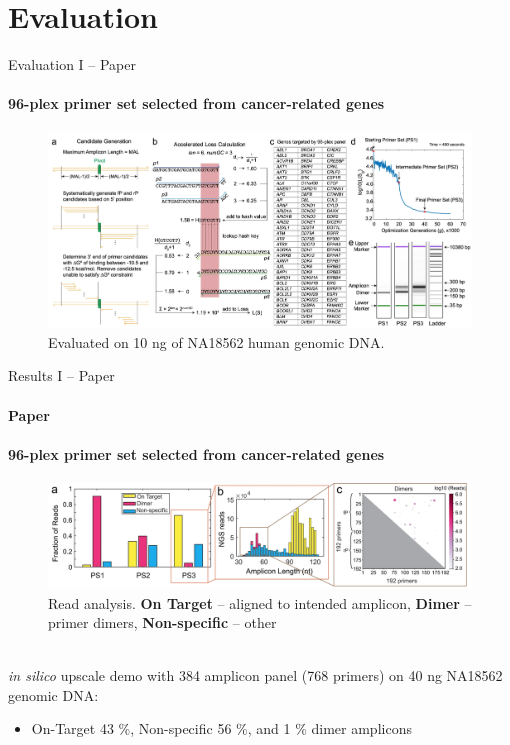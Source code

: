 \documentclass[xcolor=dvipsnames,envcountsect]{beamer}
\begin{document}
\section{Evaluation}
\begin{frame}{Evaluation I -- Paper}\framesubtitle{96-plex primer set selected from cancer-related genes}
\begin{figure}
    \includegraphics[width=\textwidth]{fig2_paper}
    \caption{Evaluated on 10 ng of NA18562 human genomic DNA.}
\end{figure}

\end{frame}

\begin{frame}{Results I -- Paper}\framesubtitle{Paper}\framesubtitle{96-plex primer set selected from cancer-related genes}
\begin{figure}
    \includegraphics[width=\textwidth]{fig3_top_paper}
    \caption{Read analysis. {\bf On Target} -- aligned to intended amplicon, {\bf Dimer} -- primer dimers, {\bf Non-specific} -- other}
\end{figure}

\hrulefill\\
{\it in silico} upscale demo with 384 amplicon panel (768 primers) on 40 ng NA18562 genomic DNA:
\begin{itemize}
    \item On-Target 43 \%,  Non-specific 56 \%, and 1 \% dimer amplicons
\end{itemize}
\end{frame}
\end{document}
